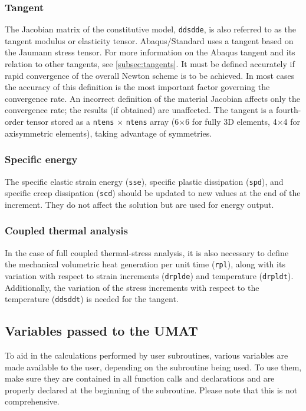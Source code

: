 \documentclass[10pt,letterpaper,oneside]{report}
\begin{document}
\subsubsection{Tangent}
The Jacobian matrix of the constitutive model, \texttt{ddsdde}, is also referred to as the tangent modulus or elasticity tensor.  Abaqus/Standard uses a tangent based on the Jaumann stress tensor.  For more information on the Abaqus tangent and its relation to other tangents, see \autoref{subsec:tangents}.  It must be defined accurately if rapid convergence of the overall Newton scheme is to be achieved. In most cases the accuracy of this definition is the most important factor governing the convergence rate. An incorrect definition of the material Jacobian affects only the convergence rate; the results (if obtained) are unaffected.  The tangent is a fourth-order tensor stored as a \texttt{ntens} $\times$ \texttt{ntens} array (6$\times$6 for fully 3D elements, 4$\times$4 for axisymmetric elements), taking advantage of symmetries.  

\subsubsection{Specific energy}
The specific elastic strain energy (\texttt{sse}), specific plastic dissipation (\texttt{spd}), and specific creep dissipation (\texttt{scd}) should be updated to new values at the end of the increment.  They do not affect the solution but are used for energy output.  

\subsubsection{Coupled thermal analysis}
In the case of full coupled thermal-stress analysis, it is also necessary to define the mechanical volumetric heat generation per unit time (\texttt{rpl}), along with its variation with respect to strain increments (\texttt{drplde}) and temperature (\texttt{drpldt}).  Additionally, the variation of the stress increments with respect to the temperature (\texttt{ddsddt}) is needed for the tangent.  


\subsection{Variables passed to the UMAT}
To aid in the calculations performed by user subroutines, various variables are made available to the user, depending on the subroutine being used.  To use them, make sure they are contained in all function calls and declarations and are properly declared at the beginning of the subroutine.  Please note that this is not comprehensive.  
\end{document}

